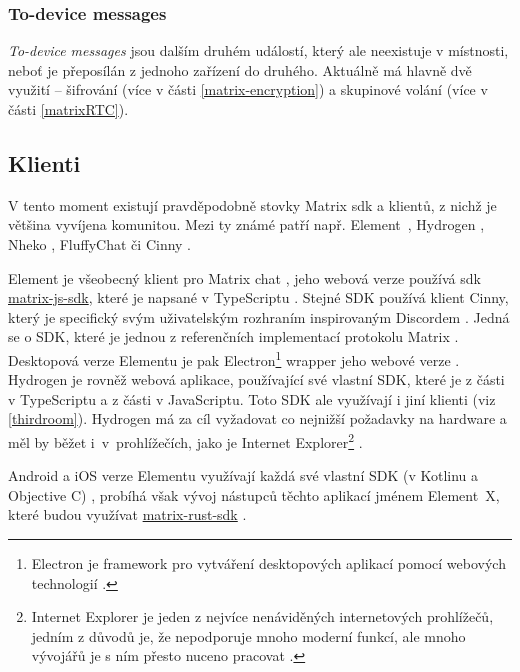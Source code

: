 \subsubsection{To-device messages}\label{toDeviceMessages}

\textit{To-device messages} jsou dalším druhém událostí, který ale neexistuje v
místnosti, neboť je přeposílán z jednoho zařízení do druhého. Aktuálně má hlavně
dvě využití -- šifrování (více v části \ref{matrix-encryption}) a skupinové
volání (více v části \ref{matrixRTC}).

\subsection{Klienti}

V tento moment existují pravděpodobně stovky Matrix \gls{sdk} a klientů, z nichž
je většina vyvíjena komunitou. Mezi ty známé patří např.
Element~\parencite{Element-Homepage}, Hydrogen \parencite{GitHub-Hydrogen},
Nheko \parencite{GitHub-Nheko}, FluffyChat \parencite{FluffyChat-Homepage} či
Cinny \parencite{Cinny-Homepage}.

Element je všeobecný klient pro Matrix chat \parencite{Element-Homepage}, jeho
webová verze používá \gls{sdk}
\href{https://github.com/matrix-org/matrix-js-sdk/}{matrix-js-sdk}, které je
napsané v TypeScriptu \parencite{GitHub-MatrixJSSDK}. Stejné SDK používá klient
Cinny, který je specifický svým uživatelským rozhraním inspirovaným Discordem
\parencite{Cinny-Homepage,GitHub-Cinny}. Jedná se o SDK, které je jednou z
referenčních implementací protokolu Matrix \parencite{GitHub-MatrixJSSDK}.
Desktopová verze Elementu je pak Electron\footnote{ Electron je framework pro
    vytváření desktopových aplikací pomocí webových technologií
    \parencite{ElectronJS-Homepage}. } wrapper jeho webové verze
\parencite{GitHub-ElementDesktop}. Hydrogen je rovněž webová aplikace,
používající své vlastní SDK, které je z části v TypeScriptu a z části v
JavaScriptu. Toto SDK ale využívají i jiní klienti (viz \ref{thirdroom}).
Hydrogen má za cíl vyžadovat co nejnižší požadavky na hardware a měl by běžet
i~v~prohlížečích, jako je Internet Explorer\footnote{ Internet Explorer je jeden
    z nejvíce nenáviděných internetových prohlížečů, jedním z důvodů je, že
    nepodporuje mnoho moderní funkcí, ale mnoho vývojářů je s ním přesto nuceno
    pracovat \parencite{ZealousSites-WhyDoWebDevelopersHateInternetExplorer}. }
\parencite{GitHub-Hydrogen}.

Android a iOS verze Elementu využívají každá své vlastní SDK (v Kotlinu a
Objective C) \parencite{GitHub-ElementAndroid,GitHub-ElementIOS}, probíhá však
vývoj nástupců těchto aplikací jménem Element~X, které budou využívat
\href{https://github.com/matrix-org/matrix-rust-sdk}{matrix-rust-sdk}
\parencite{GitHub-ElementXAndroid,GitHub-ElementXIOS}.

